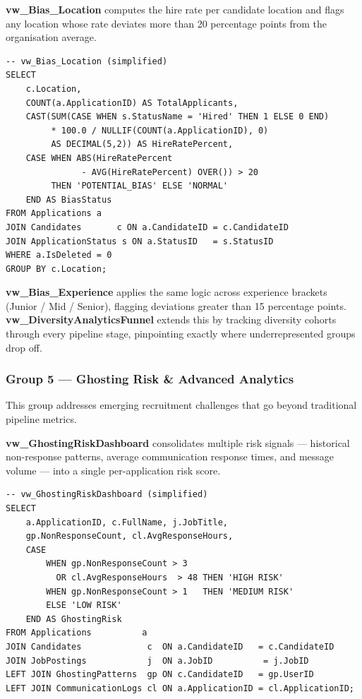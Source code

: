 \documentclass[11pt,a4paper]{article}
\begin{document}
\textbf{vw\_Bias\_Location} computes the hire rate per candidate location and flags any location whose rate deviates more than 20 percentage points from the organisation average.

\begin{verbatim}
-- vw_Bias_Location (simplified)
SELECT
    c.Location,
    COUNT(a.ApplicationID) AS TotalApplicants,
    CAST(SUM(CASE WHEN s.StatusName = 'Hired' THEN 1 ELSE 0 END)
         * 100.0 / NULLIF(COUNT(a.ApplicationID), 0)
         AS DECIMAL(5,2)) AS HireRatePercent,
    CASE WHEN ABS(HireRatePercent
               - AVG(HireRatePercent) OVER()) > 20
         THEN 'POTENTIAL_BIAS' ELSE 'NORMAL'
    END AS BiasStatus
FROM Applications a
JOIN Candidates       c ON a.CandidateID = c.CandidateID
JOIN ApplicationStatus s ON a.StatusID   = s.StatusID
WHERE a.IsDeleted = 0
GROUP BY c.Location;
\end{verbatim}

\textbf{vw\_Bias\_Experience} applies the same logic across experience brackets (Junior / Mid / Senior), flagging deviations greater than 15 percentage points. \textbf{vw\_DiversityAnalyticsFunnel} extends this by tracking diversity cohorts through every pipeline stage, pinpointing exactly where underrepresented groups drop off.

\subsubsection{Group 5 — Ghosting Risk \& Advanced Analytics}

This group addresses emerging recruitment challenges that go beyond traditional pipeline metrics.

\textbf{vw\_GhostingRiskDashboard} consolidates multiple risk signals — historical non-response patterns, average communication response times, and message volume — into a single per-application risk score.

\begin{verbatim}
-- vw_GhostingRiskDashboard (simplified)
SELECT
    a.ApplicationID, c.FullName, j.JobTitle,
    gp.NonResponseCount, cl.AvgResponseHours,
    CASE
        WHEN gp.NonResponseCount > 3
          OR cl.AvgResponseHours  > 48 THEN 'HIGH RISK'
        WHEN gp.NonResponseCount > 1   THEN 'MEDIUM RISK'
        ELSE 'LOW RISK'
    END AS GhostingRisk
FROM Applications          a
JOIN Candidates             c  ON a.CandidateID   = c.CandidateID
JOIN JobPostings            j  ON a.JobID          = j.JobID
LEFT JOIN GhostingPatterns  gp ON c.CandidateID   = gp.UserID
LEFT JOIN CommunicationLogs cl ON a.ApplicationID = cl.ApplicationID;
\end{verbatim}
\end{document}

